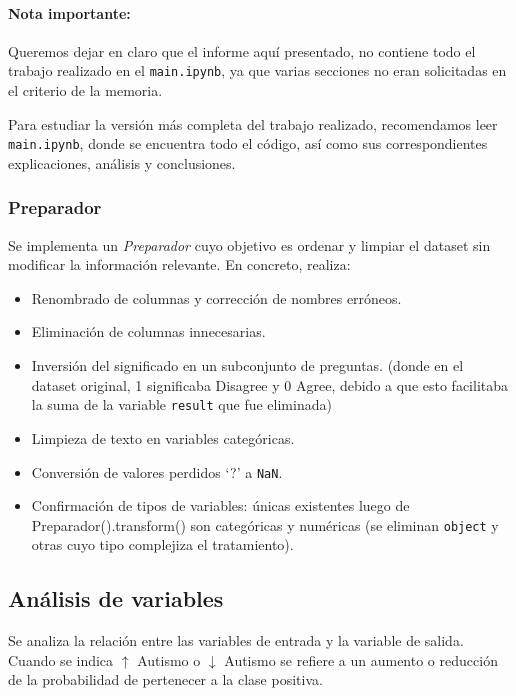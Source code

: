 \documentclass[12pt]{article}
\begin{document}
\paragraph{Nota importante:} Queremos dejar en claro que el informe aquí presentado, no contiene todo el trabajo realizado en el \texttt{main.ipynb}, ya que varias secciones no eran solicitadas en el criterio de la memoria.

Para estudiar la versión más completa del trabajo realizado, recomendamos leer \texttt{main.ipynb}, donde se encuentra todo el código, así como sus correspondientes explicaciones, análisis y conclusiones.

\subsubsection*{Preparador}
Se implementa un \emph{Preparador} cuyo objetivo es ordenar y limpiar el dataset sin modificar la
información relevante. En concreto, realiza:
\begin{itemize}
    \item Renombrado de columnas y corrección de nombres erróneos.
    \item Eliminación de columnas innecesarias.
    \item Inversión del significado en un subconjunto de preguntas. (donde en el dataset original, 1 significaba Disagree y 0 Agree, debido a que esto facilitaba la suma de la variable \texttt{result} que fue eliminada)
    \item Limpieza de texto en variables categóricas.
    \item Conversión de valores perdidos `?' a \texttt{NaN}.
    \item Confirmación de tipos de variables: únicas existentes luego de Preparador().transform() son categóricas y numéricas (se eliminan \texttt{object} y otras cuyo tipo complejiza el tratamiento).
\end{itemize}

\subsection{Análisis de variables}
Se analiza la relación entre las variables de entrada y la variable de salida.
Cuando se indica $\uparrow$ Autismo o $\downarrow$ Autismo se refiere a un aumento o
reducción de la probabilidad de pertenecer a la clase positiva.
\end{document}

